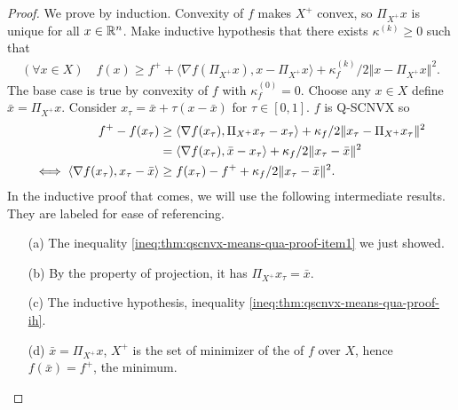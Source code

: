 \documentclass[12pt]{report}
\begin{document}
            \begin{proof}
                We prove by induction. 
                Convexity of $f$ makes $X^+$ convex, so $\Pi_{X^+}x$ is unique for all $x \in \mathbb R^n$. 
                Make inductive hypothesis that there exists $\kappa^{(k)} \ge 0$ such that 
                \begin{align}\label{ineq:thm:qscnvx-means-qua-proof-ih}
                    (\forall x \in X)\quad
                    f(x) \ge f^+ + \langle \nabla f(\Pi_{X^+}x), x - \Pi_{X^+}x\rangle 
                    + \kappa^{(k)}_f/2\Vert x - \Pi_{X^+}x \Vert^2. 
                \end{align}
                The base case is true by convexity of $f$ with $\kappa_f^{(0)} = 0$. 
                Choose any $x \in X$ define $\bar x = \Pi_{X^+}x$. 
                Consider $x_\tau = \bar x + \tau(x - \bar x)$ for $\tau \in [0, 1]$. 
                $f$ is Q-SCNVX so
                \begin{align}\label{ineq:thm:qscnvx-means-qua-proof-item1}
                    f^+ - f(x_\tau) &\ge \langle \nabla f(x_\tau), \Pi_{X^+}x_\tau - x_\tau\rangle + 
                    \kappa_f/2 \Vert x_\tau - \Pi_{X^+}x_\tau\Vert^2 
                    \notag\\
                    &= 
                    \langle \nabla f(x_\tau), \bar x - x_\tau\rangle + 
                    \kappa_f/2 \Vert x_\tau - \bar x\Vert^2
                    \notag\\
                    \iff 
                    \langle \nabla f(x_\tau), x_\tau - \bar x\rangle
                    &\ge f(x_\tau) - f^+ + \kappa_f/2\Vert x_\tau -\bar x\Vert^2. 
                \end{align}
                In the inductive proof that comes, we will use the following intermediate results. 
                They are labeled for ease of referencing. 
                \begin{enumerate}
                    \item[(a)] The inequality \eqref{ineq:thm:qscnvx-means-qua-proof-item1} we just showed. 
                    \item[(b)] By the property of projection, it has $\Pi_{X^+} x_\tau = \bar x$. 
                    \item[(c)] The inductive hypothesis, inequality \eqref{ineq:thm:qscnvx-means-qua-proof-ih}. 
                    \item[(d)] $\bar x = \Pi_{X^+}x$, $X^+$ is the set of minimizer of the of $f$ over $X$, hence $f(\bar x) = f^+$, the minimum. 

\end{enumerate}
\end{proof}
\end{document}
